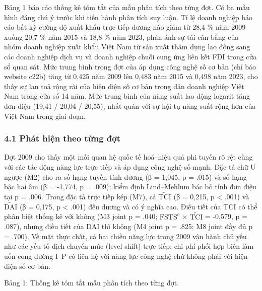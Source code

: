 \documentclass[12pt,a4paper]{article}
\begin{document}
Bảng 1 báo cáo thống kê tóm tắt của mẫu phân tích theo từng đợt. Có ba
mẫu hình đáng chú ý trước khi tiến hành phân tích suy luận. Tỉ lệ doanh
nghiệp báo cáo bất kỳ cường độ xuất khẩu trực tiếp dương nào giảm từ
28,4 \% năm 2009 xuống 20,7 \% năm 2015 và 18,8 \% năm 2023, phản ánh sự
tái cân bằng của nhóm doanh nghiệp xuất khẩu Việt Nam từ sản xuất thâm
dụng lao động sang các doanh nghiệp dịch vụ và doanh nghiệp chuỗi cung
ứng liên kết FDI trong cửa sổ quan sát. Mức trung bình trong đợt của áp
dụng công nghệ số cơ bản (chỉ báo website c22b) tăng từ 0,425 năm 2009
lên 0,483 năm 2015 và 0,498 năm 2023, cho thấy sự lan toả rộng rãi của
hiện diện số cơ bản trong dân doanh nghiệp Việt Nam trong cửa sổ 14 năm.
Mức trung bình của năng suất lao động logarit tăng đơn điệu (19,41 /
20,04 / 20,55), nhất quán với sự hội tụ năng suất rộng hơn của Việt Nam
trong giai đoạn.

\hypertarget{41-phuxe1t-hiux1ec7n-theo-tux1eebng-ux111ux1ee3t}{%
\subsubsection{4.1 Phát hiện theo từng
đợt}\label{41-phuxe1t-hiux1ec7n-theo-tux1eebng-ux111ux1ee3t}}

Đợt 2009 cho thấy một mối quan hệ quốc tế hoá--hiệu quả phi tuyến rõ rệt
cùng với các tác động năng lực trực tiếp và áp dụng công nghệ số mạnh.
Đặc tả chữ U ngược (M2) cho ra số hạng tuyến tính dương (β = 1,045, p =
.015) và số hạng bậc hai âm (β = -1,774, p = .009); kiểm định
Lind--Mehlum bác bỏ tính đơn điệu tại p = .006. Trong đặc tả trực tiếp
kép (M7), cả \(\tilde{\mathrm{TCI}}\) (β = 0,215, p \textless{} .001) và
\(\tilde{\mathrm{DAI}}\) (β = 0,175, p \textless{} .001) đều dương và có
ý nghĩa cao. Điều tiết của TCI có thể phân biệt thống kê với không (M3
joint p = .040; \(\mathrm{FSTS}^{c}\) × \(\tilde{\mathrm{TCI}}\) =
-0,579, p = .087), nhưng điều tiết của DAI thì không (M4 joint p = .825;
M8 joint đầy đủ p = .700). Về mặt thực chất, cả hai chiều năng lực trong
2009 vận hành chủ yếu như các yếu tố dịch chuyển mức (level shift) trực
tiếp; chi phí phối hợp biên làm uốn cong đường I--P có liên hệ với năng
lực công nghệ chứ không phải với hiện diện số cơ bản.

Bảng 1: Thống kê tóm tắt mẫu phân tích theo từng đợt.
\end{document}
